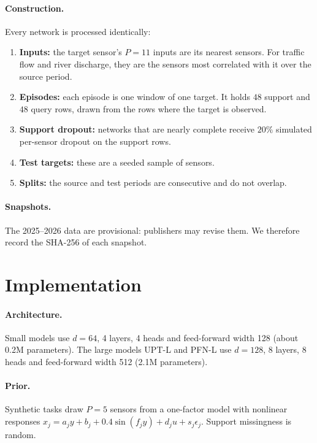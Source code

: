 \paragraph{Construction.} Every network is processed identically:
\begin{enumerate}
  \item \textbf{Inputs:} the target sensor's $P=11$ inputs are its nearest sensors. For traffic flow and river discharge, they
   are the sensors most correlated with it over the source period.
  \item \textbf{Episodes:} each episode is one window of one target. It holds $48$ support and $48$ query rows, drawn from the
   rows where the target is observed.
  \item \textbf{Support dropout:} networks that are nearly complete receive $20\%$ simulated per-sensor dropout on the support
   rows.
  \item \textbf{Test targets:} these are a seeded sample of sensors.
  \item \textbf{Splits:} the source and test periods are consecutive and do not overlap.
\end{enumerate}

\paragraph{Snapshots.} The 2025--2026 data are provisional: publishers may revise them. We therefore record the SHA-256 of
each snapshot.

\section{Implementation}
\label{app:impl}

\paragraph{Architecture.} Small models use $d=64$, 4 layers, 4 heads and feed-forward width 128 (about 0.2M parameters). The
large models UPT-L and PFN-L use $d=128$, 8 layers, 8 heads and feed-forward width 512 (2.1M parameters).

\paragraph{Prior.} Synthetic tasks draw $P=5$ sensors from a one-factor model with nonlinear responses
$x_j=a_jy+b_j+0.4\sin(f_jy)+d_ju+s_j\epsilon_j$. Support missingness is random.

